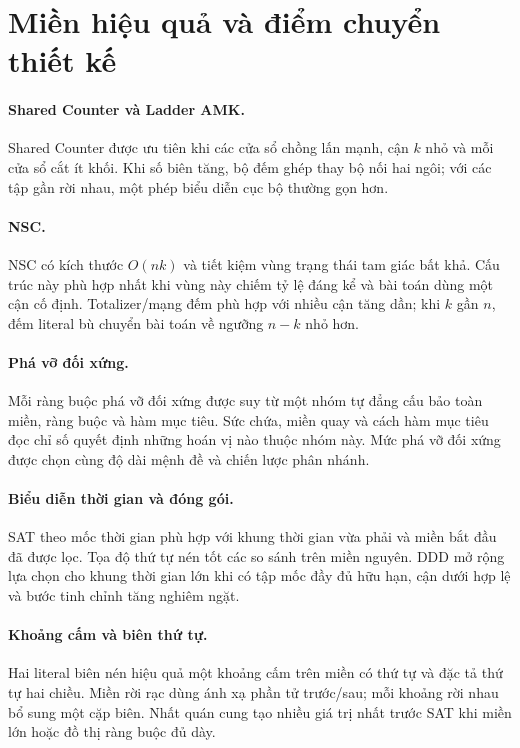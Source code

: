 \section{Miền hiệu quả và điểm chuyển thiết kế}

\paragraph{Shared Counter và Ladder AMK.}
Shared Counter được ưu tiên khi các cửa sổ chồng lấn mạnh, cận \(k\) nhỏ và
mỗi cửa sổ cắt ít khối. Khi số biên tăng, bộ đếm ghép thay bộ nối hai ngôi;
với các tập gần rời nhau, một phép biểu diễn cục bộ thường gọn hơn.

\paragraph{NSC.}
NSC có kích thước \(O(nk)\) và tiết kiệm vùng trạng thái tam giác bất khả. Cấu trúc này
phù hợp nhất khi vùng này chiếm tỷ lệ đáng kể và bài toán dùng một cận cố định.
Totalizer/mạng đếm phù hợp với nhiều cận tăng dần; khi \(k\) gần \(n\), đếm
literal bù chuyển bài toán về ngưỡng \(n-k\) nhỏ hơn.

\paragraph{Phá vỡ đối xứng.}
Mỗi ràng buộc phá vỡ đối xứng được suy từ một nhóm tự đẳng cấu bảo toàn miền, ràng
buộc và hàm mục tiêu. Sức chứa, miền quay và cách hàm mục tiêu đọc chỉ số quyết
định những hoán vị nào thuộc nhóm này. Mức phá vỡ đối xứng được chọn cùng độ dài
mệnh đề và chiến lược phân nhánh.

\paragraph{Biểu diễn thời gian và đóng gói.}
SAT theo mốc thời gian phù hợp với khung thời gian vừa phải và miền bắt đầu đã được
lọc. Tọa độ thứ tự nén tốt các so sánh trên miền nguyên. DDD mở rộng lựa chọn
cho khung thời gian lớn khi có tập mốc đầy đủ hữu hạn, cận dưới hợp lệ và bước tinh
chỉnh tăng nghiêm ngặt.

\paragraph{Khoảng cấm và biên thứ tự.}
Hai literal biên nén hiệu quả một khoảng cấm trên miền có thứ tự và đặc tả thứ
tự hai chiều. Miền rời rạc dùng ánh xạ phần tử trước/sau; mỗi khoảng rời nhau
bổ sung một cặp biên. Nhất quán cung tạo nhiều giá trị nhất trước SAT khi miền
lớn hoặc đồ thị ràng buộc đủ dày.

